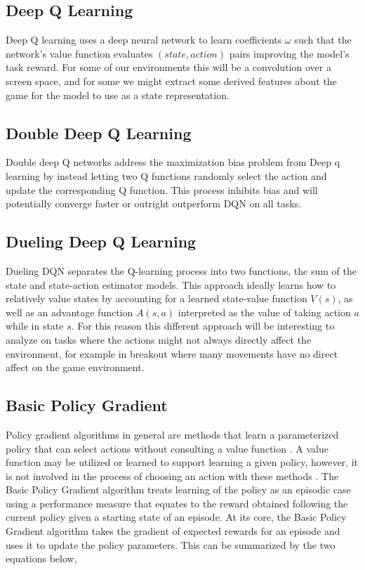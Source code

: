 \documentclass[conference]{IEEEtran}
\begin{document}
\subsection{Deep Q Learning}
Deep Q learning uses a deep neural network to learn coefficients $\omega$ such that the network's value function evaluates $(state, action)$ pairs improving the model's task reward. For some of our environments this will be a convolution over a screen space, and for some we might extract some derived features about the game for the model to use as a state representation.

\subsection{Double Deep Q Learning}
Double deep Q networks address the maximization bias problem from Deep q learning by instead letting two Q functions randomly select the action and update the corresponding Q function. This process inhibits bias and will potentially converge faster or outright outperform DQN on all tasks.

\subsection{Dueling Deep Q Learning}
Dueling DQN separates the Q-learning process into two functions, the sum of the state and state-action estimator models. This approach ideally learns how to relatively value states by accounting for a learned state-value function $V(s)$, as well as an advantage function $A(s,a)$ interpreted as the value of taking action $a$ while in state $s$. For this reason this different approach will be interesting to analyze on tasks where the actions might not always directly affect the environment, for example in breakout where many movements have no direct affect on the game environment.

\subsection{Basic Policy Gradient}
Policy gradient algorithms in general are methods that learn a parameterized policy that can select actions without consulting a value function \cite{ReinforcementLearningBook}.
A value function may be utilized or learned to support learning a given policy, however, it is not involved in the process of choosing an action with these methods \cite{ReinforcementLearningBook}.
The Basic Policy Gradient algorithm treats learning of the policy as an episodic case using a performance measure that equates to the reward obtained following the current policy given a starting state of an episode. 
At its core, the Basic Policy Gradient algorithm takes the gradient of expected rewards for an episode and uses it to update the policy parameters.
This can be summarized by the two equations below,
\end{document}
